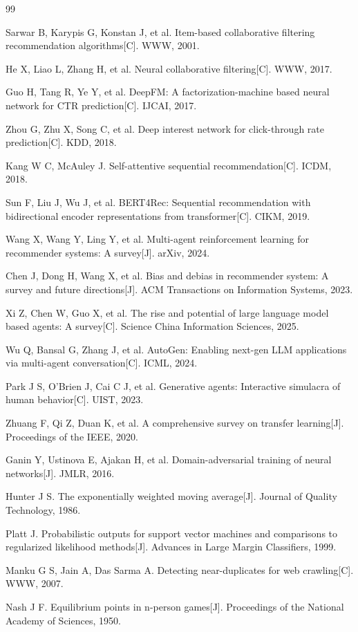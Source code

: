 \documentclass[11pt,a4paper]{ctexart}
\theoremstyle{remark}
\begin{document}
\begin{thebibliography}{99}

Sarwar B, Karypis G, Konstan J, et al. Item-based collaborative filtering recommendation algorithms[C]. WWW, 2001.

He X, Liao L, Zhang H, et al. Neural collaborative filtering[C]. WWW, 2017.

Guo H, Tang R, Ye Y, et al. DeepFM: A factorization-machine based neural network for CTR prediction[C]. IJCAI, 2017.

Zhou G, Zhu X, Song C, et al. Deep interest network for click-through rate prediction[C]. KDD, 2018.

Kang W C, McAuley J. Self-attentive sequential recommendation[C]. ICDM, 2018.

Sun F, Liu J, Wu J, et al. BERT4Rec: Sequential recommendation with bidirectional encoder representations from transformer[C]. CIKM, 2019.

Wang X, Wang Y, Ling Y, et al. Multi-agent reinforcement learning for recommender systems: A survey[J]. arXiv, 2024.

Chen J, Dong H, Wang X, et al. Bias and debias in recommender system: A survey and future directions[J]. ACM Transactions on Information Systems, 2023.

Xi Z, Chen W, Guo X, et al. The rise and potential of large language model based agents: A survey[C]. Science China Information Sciences, 2025.

Wu Q, Bansal G, Zhang J, et al. AutoGen: Enabling next-gen LLM applications via multi-agent conversation[C]. ICML, 2024.

Park J S, O'Brien J, Cai C J, et al. Generative agents: Interactive simulacra of human behavior[C]. UIST, 2023.

Zhuang F, Qi Z, Duan K, et al. A comprehensive survey on transfer learning[J]. Proceedings of the IEEE, 2020.

Ganin Y, Ustinova E, Ajakan H, et al. Domain-adversarial training of neural networks[J]. JMLR, 2016.

Hunter J S. The exponentially weighted moving average[J]. Journal of Quality Technology, 1986.

Platt J. Probabilistic outputs for support vector machines and comparisons to regularized likelihood methods[J]. Advances in Large Margin Classifiers, 1999.

Manku G S, Jain A, Das Sarma A. Detecting near-duplicates for web crawling[C]. WWW, 2007.

Nash J F. Equilibrium points in n-person games[J]. Proceedings of the National Academy of Sciences, 1950.

\end{thebibliography}
\end{document}
